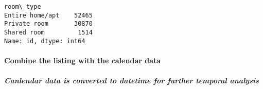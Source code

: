 \documentclass[11pt]{article}
\begin{document}
    \begin{Verbatim}[commandchars=\\\{\}]
room\_type
Entire home/apt    52465
Private room       30870
Shared room         1514
Name: id, dtype: int64

    \end{Verbatim}

    \hypertarget{combine-the-listing-with-the-calendar-data}{%
\paragraph{Combine the listing with the calendar
data}\label{combine-the-listing-with-the-calendar-data}}

\hypertarget{canlendar-data-is-converted-to-datetime-for-further-temporal-analysis}{%
\subparagraph{Canlendar data is converted to datetime for further
temporal
analysis}\label{canlendar-data-is-converted-to-datetime-for-further-temporal-analysis}}
\end{document}
